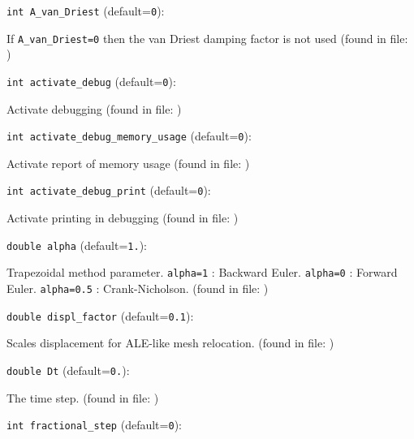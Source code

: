 \item\verb+int A_van_Driest+ {\rm(default=\verb|0|)}:

If {\tt A\_van\_Driest=0} then the van Driest
   damping factor is not used 
 (found in file: \verb++)
\item\verb+int activate_debug+ {\rm(default=\verb|0|)}:

Activate debugging
 (found in file: \verb++)
\item\verb+int activate_debug_memory_usage+ {\rm(default=\verb|0|)}:

Activate report of memory usage
 (found in file: \verb++)
\item\verb+int activate_debug_print+ {\rm(default=\verb|0|)}:

Activate printing in debugging
 (found in file: \verb++)
\item\verb+double alpha+ {\rm(default=\verb|1.|)}:

Trapezoidal method parameter.  \verb+alpha=1+ :
Backward Euler.  \verb+alpha=0+ : Forward Euler.
 \verb+alpha=0.5+ : Crank-Nicholson. 
 (found in file: \verb++)
\item\verb+double displ_factor+ {\rm(default=\verb|0.1|)}:

Scales displacement for ALE-like mesh relocation. 
 (found in file: \verb++)
\item\verb+double Dt+ {\rm(default=\verb|0.|)}:

The time step.
 (found in file: \verb++)
\item\verb+int fractional_step+ {\rm(default=\verb|0|)}:


